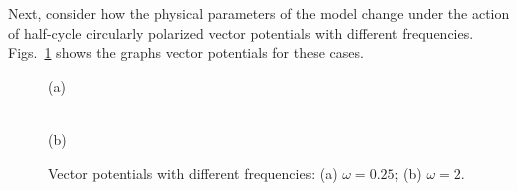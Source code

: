 
Next, consider how the physical parameters of the model change under the action of half-cycle circularly polarized vector potentials with different frequencies. Figs.~\ref{fig:Pulses_2} shows the graphs vector potentials for these cases. 
\begin{figure}[h!]
\begin{minipage}[h]{0.5\linewidth}
 (a) \\
\end{minipage}
\begin{minipage}[h]{0.5\linewidth}
 \\(b)
\end{minipage}
\caption{Vector potentials with different frequencies: (a) $\omega=0.25$; (b) $\omega=2$.}
\label{fig:Pulses_2}
\end{figure}

